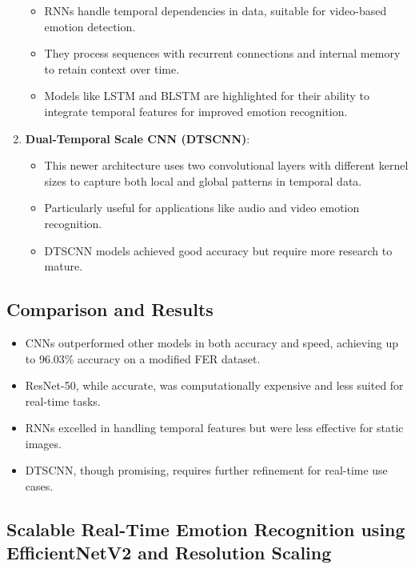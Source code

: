 \documentclass{article}
\begin{document}
\begin{enumerate}
    \begin{itemize}
        \item RNNs handle temporal dependencies in data, suitable for video-based emotion detection.
        \item They process sequences with recurrent connections and internal memory to retain context over time.
        \item Models like LSTM and BLSTM are highlighted for their ability to integrate temporal features for improved emotion recognition.
    \end{itemize}
    \item \textbf{Dual-Temporal Scale CNN (DTSCNN)}:
    \begin{itemize}
        \item This newer architecture uses two convolutional layers with different kernel sizes to capture both local and global patterns in temporal data.
        \item Particularly useful for applications like audio and video emotion recognition.
        \item DTSCNN models achieved good accuracy but require more research to mature.
    \end{itemize}
\end{enumerate}

\subsection*{Comparison and Results}

\begin{itemize}
    \item CNNs outperformed other models in both accuracy and speed, achieving up to 96.03\% accuracy on a modified FER dataset.
    \item ResNet-50, while accurate, was computationally expensive and less suited for real-time tasks.
    \item RNNs excelled in handling temporal features but were less effective for static images.
    \item DTSCNN, though promising, requires further refinement for real-time use cases.
\end{itemize}

\subsection*{Scalable Real-Time Emotion Recognition using EfficientNetV2 and Resolution Scaling}
\end{document}
